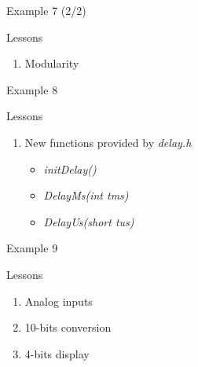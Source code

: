 \begin{frame}{Example 7 (2/2)}



\end{frame}

\begin{frame}{Lessons}

\begin{enumerate}
\def\labelenumi{\arabic{enumi}.}
\tightlist
\item
  Modularity
\end{enumerate}

\end{frame}

\begin{frame}{Example 8}



\end{frame}

\begin{frame}{Lessons}

\begin{enumerate}
\def\labelenumi{\arabic{enumi}.}
\tightlist
\item
  New functions provided by \emph{delay.h}

  \begin{itemize}
  \tightlist
  \item
    \emph{initDelay()}
  \item
    \emph{DelayMs(int tms)}
  \item
    \emph{DelayUs(short tus)}
  \end{itemize}
\end{enumerate}

\end{frame}

\begin{frame}{Example 9}



\end{frame}

\begin{frame}{Lessons}

\begin{enumerate}
\def\labelenumi{\arabic{enumi}.}
\tightlist
\item
  Analog inputs
\item
  10-bits conversion
\item
  4-bits display
\end{enumerate}

\end{frame}


